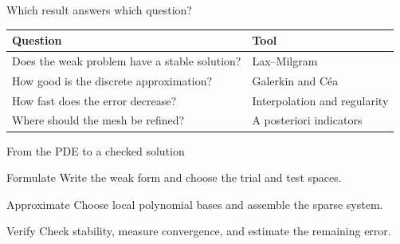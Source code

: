 \documentclass[aspectratio=169,11pt]{beamer}
\begin{document}
\begin{frame}{Which result answers which question?}
\begin{center}\renewcommand{\arraystretch}{1.7}
\begin{tabular}{ll}\toprule
\textbf{Question}&\textbf{Tool}\\\midrule
Does the weak problem have a stable solution? & Lax--Milgram\\
How good is the discrete approximation? & Galerkin and C\'ea\\
How fast does the error decrease? & Interpolation and regularity\\
Where should the mesh be refined? & A posteriori indicators\\\bottomrule
\end{tabular}\end{center}
\end{frame}

\begin{frame}{From the PDE to a checked solution}
\begin{block}{Formulate}
Write the weak form and choose the trial and test spaces.
\end{block}\begin{exampleblock}{Approximate}
Choose local polynomial bases and assemble the sparse system.
\end{exampleblock}\begin{block}{Verify}
Check stability, measure convergence, and estimate the remaining error.
\end{block}
\end{frame}
\end{document}
